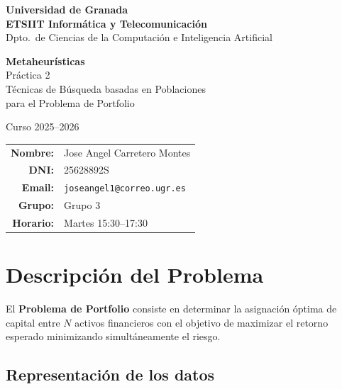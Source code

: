 \documentclass[12pt,a4paper]{article}
\begin{document}
\begin{titlepage}
  \centering
  \vspace*{2cm}
  {\Large \textbf{Universidad de Granada}\\[0.3cm]
          \textbf{ETSIIT Informática y Telecomunicación}\\[0.3cm]
          Dpto.\ de Ciencias de la Computación e Inteligencia Artificial}
  \vspace{2.5cm}

  {\LARGE \textbf{Metaheurísticas}}\\[0.5cm]
  {\Large Práctica 2}\\[0.3cm]
  {\large Técnicas de Búsqueda basadas en Poblaciones\\
           para el Problema de Portfolio}

  \vspace{1.5cm}
  {\large Curso 2025--2026}

  \vfill
  \begin{tabular}{rl}
    \textbf{Nombre:}  & Jose Angel Carretero Montes \\[4pt]
    \textbf{DNI:}     & 25628892S \\[4pt]
    \textbf{Email:}   & \texttt{joseangel1@correo.ugr.es} \\[4pt]
    \textbf{Grupo:}   & Grupo 3 \\[4pt]
    \textbf{Horario:} & Martes 15:30--17:30 \\
  \end{tabular}
  \vspace{1.5cm}
\end{titlepage}

\tableofcontents
\newpage

\section{Descripción del Problema}

El \textbf{Problema de Portfolio} consiste en determinar la asignación óptima de capital
entre $N$ activos financieros con el objetivo de maximizar el retorno esperado
minimizando simultáneamente el riesgo.

\subsection*{Representación de los datos}
\end{document}
